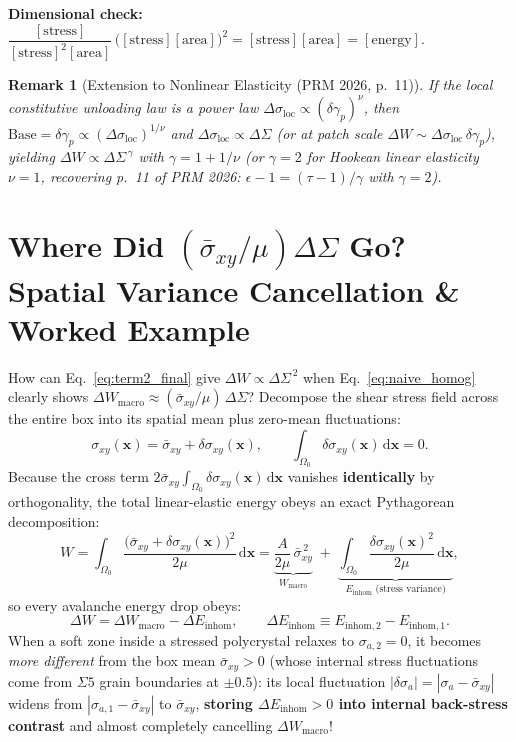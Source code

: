 \documentclass[11pt,a4paper]{article}
\newcommand{\dS}{\Delta\Sigma}
\newcommand{\dW}{\Delta W}
\newcommand{\sigbar}{\bar{\sigma}_{xy}}
\newcommand{\dsigloc}{\Delta\sigma_{\mathrm{loc}}}
\newcommand{\dgamp}{\delta\gamma_p}
\newtheorem{remark}{Remark}
\begin{document}
\noindent\textbf{Dimensional check:} $\dfrac{[\text{stress}]}{[\text{stress}]^2[\text{area}]}\,\big([\text{stress}][\text{area}]\big)^2 = [\text{stress}][\text{area}] = [\text{energy}]$. \checkmark

\begin{remark}[Extension to Nonlinear Elasticity (PRM 2026, p.~11)]
If the local constitutive unloading law is a power law $\dsigloc \propto (\dgamp)^\nu$, then $\text{Base} = \dgamp \propto (\dsigloc)^{1/\nu}$ and $\dsigloc \propto \dS$ (or at patch scale $\dW \sim \dsigloc\,\dgamp$), yielding $\dW \propto \dS^{\,\gamma}$ with $\gamma = 1 + 1/\nu$ (or $\gamma = 2$ for Hookean linear elasticity $\nu=1$, recovering p.~11 of PRM 2026: $\epsilon - 1 = (\tau - 1)/\gamma$ with $\gamma=2$).
\end{remark}

\section{Where Did \texorpdfstring{$(\sigbar/\mu)\dS$}{(sigma\_bar/mu) Delta Sigma} Go? Spatial Variance Cancellation \& Worked Example}
\label{sec:variance_cancellation}

How can Eq.~\eqref{eq:term2_final} give $\dW \propto \dS^{\,2}$ when Eq.~\eqref{eq:naive_homog} clearly shows $\Delta W_{\mathrm{macro}} \approx (\sigbar/\mu)\,\dS$? Decompose the shear stress field across the entire box into its spatial mean plus zero-mean fluctuations:
\[
\sigma_{xy}(\mathbf{x}) = \sigbar + \delta\sigma_{xy}(\mathbf{x}),
\qquad \int_{\Omega_0}\delta\sigma_{xy}(\mathbf{x})\,\mathrm{d}\mathbf{x} = 0.
\]
Because the cross term $2\sigbar\int_{\Omega_0}\delta\sigma_{xy}(\mathbf{x})\,\mathrm{d}\mathbf{x}$ vanishes \textbf{identically} by orthogonality, the total linear-elastic energy obeys an exact Pythagorean decomposition:
\begin{equation}
\label{eq:pythagoras}
W = \int_{\Omega_0}\frac{\big(\sigbar + \delta\sigma_{xy}(\mathbf{x})\big)^2}{2\mu}\,\mathrm{d}\mathbf{x}
= \underbrace{\frac{A}{2\mu}\,\sigbar^{\,2}}_{W_{\mathrm{macro}}}
\;+\; \underbrace{\int_{\Omega_0}\frac{\delta\sigma_{xy}(\mathbf{x})^2}{2\mu}\,\mathrm{d}\mathbf{x}}_{E_{\mathrm{inhom}}\text{ (stress variance)}},
\end{equation}
so every avalanche energy drop obeys:
\begin{equation}
\label{eq:exact_split_diff}
\dW = \Delta W_{\mathrm{macro}} - \Delta E_{\mathrm{inhom}},
\qquad
\Delta E_{\mathrm{inhom}} \equiv E_{\mathrm{inhom},2} - E_{\mathrm{inhom},1}.
\end{equation}
When a soft zone inside a stressed polycrystal relaxes to $\sigma_{a,2}=0$, it becomes \emph{more different} from the box mean $\sigbar > 0$ (whose internal stress fluctuations come from $\Sigma 5$ grain boundaries at $\pm 0.5$): its local fluctuation $|\delta\sigma_a| = |\sigma_a - \sigbar|$ widens from $|\sigma_{a,1}-\sigbar|$ to $\sigbar$, \textbf{storing $\Delta E_{\mathrm{inhom}} > 0$ into internal back-stress contrast} and almost completely cancelling $\Delta W_{\mathrm{macro}}$!
\end{document}
